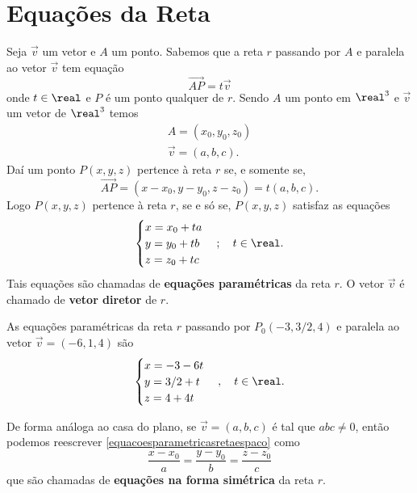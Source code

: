 
\section{Equações da Reta} %
\label{sec:equacoes_da_reta}

Seja $\vec{v}$ um vetor e $A$ um ponto. Sabemos que a reta $r$ passando por $A$ e paralela ao vetor $\vec{v}$ tem equação
\begin{equation}
    \vec{AP} = t\vec{v}
\end{equation}
onde $t \in \real$ e $P$ é um ponto qualquer de $r$. Sendo $A$ um ponto em $\real^3$ e $\vec{v}$ um vetor de $\real^3$ temos
\begin{align*}
    A = (x_0, y_0, z_0)\\
    \vec{v} = (a, b, c).
\end{align*}
Daí um ponto $P(x, y, z)$ pertence \`a reta $r$ se, e somente se,
\[
    \vec{AP} = (x - x_0, y - y_0, z - z_0) = t(a, b, c).
\]
Logo $P(x, y, z)$ pertence \`a reta $r$, se e s\'o se, $P(x,y,z)$ satisfaz as equações
\begin{equation}\label{equacoesparametricasretaespaco}
    \begin{cases}
        x = x_0 + ta\\
        y = y_0 + tb\\
        z = z_0 + tc
    \end{cases}; \quad t \in \real.
\end{equation}
Tais equações são chamadas de \textbf{equações paramétricas} da reta $r$. O vetor $\vec{v}$ é chamado de \textbf{vetor diretor} de $r$.

\begin{exemplo}
    As equações paramétricas da reta $r$ passando por $P_0(-3,3/2,4)$ e paralela ao vetor $\vec{v} = (-6,1,4)$ são
    \[
        \begin{cases}
            x = -3 - 6t\\
            y = 3/2 + t\\
            z = 4 + 4t
        \end{cases},\quad t \in \real.
    \]
\end{exemplo}

De forma análoga ao casa do plano, se $\vec{v} = (a,b,c)$ é tal que $abc \ne 0$, então podemos reescrever \eqref{equacoesparametricasretaespaco} como
\[
    \dfrac{x - x_0}{a} = \dfrac{y - y_0}{b} = \dfrac{z - z_0}{c}
\]
que são chamadas de \textbf{equações na forma simétrica} da reta $r$.
